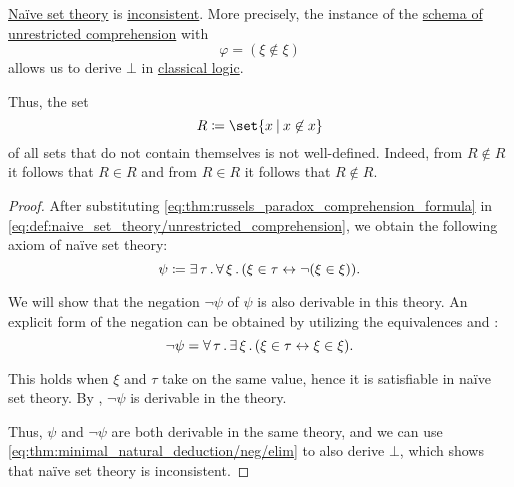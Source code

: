 \begin{theorem}\label{thm:russels_paradox}
  \hyperref[def:naive_set_theory]{Na\"ive set theory} is \hyperref[def:first_order_theory_consistency]{inconsistent}. More precisely, the instance of the \hyperref[def:naive_set_theory/unrestricted_comprehension]{schema of unrestricted comprehension} with
  \begin{equation}\label{eq:thm:russels_paradox_comprehension_formula}
    \varphi = (\xi \not\in \xi)
  \end{equation}
  allows us to derive \( \bot \) in \hyperref[def:classical_logic]{classical logic}.

  Thus, the set
  \begin{equation}\label{eq:thm:russels_paradox_set}
    R \coloneqq \set{ x \given x \not\in x }
  \end{equation}
  of all sets that do not contain themselves is not well-defined. Indeed, from \( R \not\in R \) it follows that \( R \in R \) and from \( R \in R \) it follows that \( R \not\in R \).
\end{theorem}
\begin{proof}
  After substituting \eqref{eq:thm:russels_paradox_comprehension_formula} in \eqref{eq:def:naive_set_theory/unrestricted_comprehension}, we obtain the following axiom of na\"ive set theory:
  \begin{equation}\label{eq:thm:russels_paradox_comprehension_axiom}
    \psi \coloneqq \exists \thinspace \tau \thinspace . \thinspace \forall \thinspace \xi \thinspace . \thinspace (\xi \in \tau \leftrightarrow \neg (\xi \in \xi)).
  \end{equation}

  We will show that the negation \( \neg\psi \) of \( \psi \) is also derivable in this theory. An explicit form of the negation can be obtained by utilizing the equivalences  and :
  \begin{equation*}
    \neg\psi = \forall \thinspace \tau \thinspace . \thinspace \exists \thinspace \xi \thinspace . \thinspace (\xi \in \tau \leftrightarrow \xi \in \xi).
  \end{equation*}

  This holds when \( \xi \) and \( \tau \) take on the same value, hence it is satisfiable in na\"ive set theory. By , \( \neg\psi \) is derivable in the theory.

  Thus, \( \psi \) and \( \neg\psi \) are both derivable in the same theory, and we can use \eqref{eq:thm:minimal_natural_deduction/neg/elim} to also derive \( \bot \), which shows that na\"ive set theory is inconsistent.
\end{proof}


